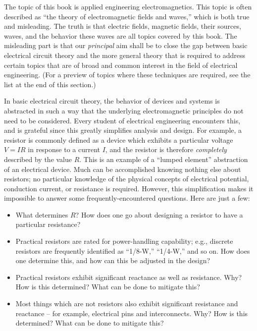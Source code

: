
\label{m0037_What_is_EM} %

The topic of this book is applied engineering electromagnetics.
This topic is often described as ``the theory of electromagnetic fields and waves,'' which is both true and misleading.
The truth is that electric fields, magnetic fields, their sources, waves, and the behavior these waves are all topics covered by this book.
The misleading part is that our \emph{principal} aim shall be to close the gap between basic electrical circuit theory and the more general theory that is required to address certain topics that are of broad and common interest in the field of electrical engineering. 
(For a preview of topics where these techniques are required, see the list at the end of this section.)

In basic electrical circuit theory, the behavior of devices and systems is abstracted in such a way that the underlying electromagnetic principles do not need to be considered.
Every student of electrical engineering encounters this, and is grateful since this greatly simplifies analysis and design. 
For example, a resistor 
is commonly defined as a device which exhibits a particular voltage $V=IR$ in response to a current $I$, and the resistor is therefore \emph{completely} described by the value $R$.
This is an example of a ``lumped element'' abstraction of an electrical device. 
Much can be accomplished knowing nothing else about resistors; no particular knowledge of the physical concepts of electrical potential, conduction current, or resistance is required.
However, this simplification makes it impossible to answer some frequently-encountered questions.
Here are just a few:
%
\begin{itemize}
\item What determines $R$?  How does one go about designing a resistor to have a particular resistance?
\item Practical resistors are rated for power-handling capability; e.g., discrete resistors are frequently identified as ``1/8-W,'' ``1/4-W,'' and so on.  How does one determine this, and how can this be adjusted in the design?
\item Practical resistors exhibit significant reactance as well as resistance.  Why?  How is this determined?  What can be done to mitigate this?      
\item Most things which are not resistors also exhibit significant resistance and reactance -- for example, electrical pins and interconnects.  Why?  How is this determined?  What can be done to mitigate this? 
\end{itemize}

